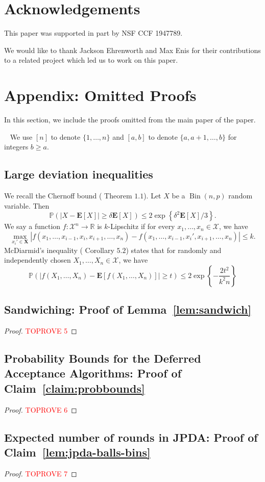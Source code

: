 \documentclass[11pt]{amsart}
\newcommand{\pparagraph}[1]{
\vspace{0.13in}\noindent{\textbf{\boldmath #1}}~}
\begin{document}
%
 \section{Acknowledgements}
This paper was supported in part by NSF CCF 1947789.  

We would like to thank Jackson Ehrenworth and Max Enis for their contributions to a 
related project which led us to work on this paper.
 

\section{Appendix: Omitted Proofs}\label{sec:appendix}
In this section, we include the proofs omitted from the main paper of the paper.

\pparagraph{Notation.} We use $[n]$ to denote $\{1, \ldots, n\}$ and $[a, b]$ to
denote $\{a, a+1, \ldots, b\}$ for integers $b\geq a$.


\subsection{Large deviation inequalities}
We recall the Chernoff bound (\cite{DP09} Theorem $1.1$). Let $X$ be a $\operatorname{Bin}(n,p)$ random variable. Then
\[
\mathbb{P}(|X - \mathbf{E}[X]| \geq \delta \mathbf{E}[X]) \leq 2\exp\left\{\delta^2\mathbf{E}[X]/3\right\}.
\]
We say a function $f:\mathcal{X}^n \rightarrow \mathbb{R}$ is $k$-Lipschitz if for every $x_1,\ldots,x_n \in \mathcal{X}$, we have
\[
\max_{x_i'\in \mathbf{X}}|f(x_1,\ldots,x_{i-1},x_i,x_{i+1},\ldots,x_n) - f(x_1,\ldots,x_{i-1},x_i',x_{i+1},\ldots,x_n)| \leq k.
\]
McDiarmid's inequality (\cite{DP09} Corollary $5.2$) states that for randomly and independently chosen $X_1,\ldots,X_n \in \mathcal{X}$, we have
\[
\mathbb{P}(|f(X_1,\ldots,X_n) - \mathbf{E}[f(X_1,\ldots,X_n)]| \geq t) \leq 2\exp\left\{-\frac{2t^2}{k^2n}\right\}
\]


\subsection{Sandwiching: Proof of Lemma~\ref{lem:sandwich}}

\begin{proof}\textcolor{red}{TOPROVE 5}\end{proof}

\subsection{Probability Bounds for the Deferred Acceptance Algorithms: Proof of Claim~\ref{claim:probbounds}}

\begin{proof}\textcolor{red}{TOPROVE 6}\end{proof}

\subsection{Expected number of rounds in JPDA: Proof of Claim~\ref{lem:jpda-balls-bins}}

\begin{proof}\textcolor{red}{TOPROVE 7}\end{proof}
 
\end{document}
